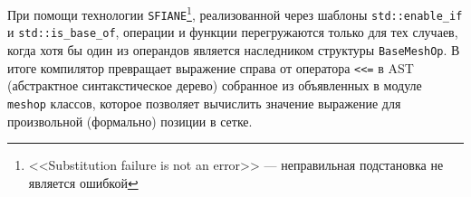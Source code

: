 При помощи технологии \verb'SFIANE'\footnote{<<Substitution failure is not an error>> --- неправильная подстановка не является ошибкой},
реализованной через шаблоны \verb'std::enable_if' и \verb'std::is_base_of', операции и функции перегружаются только для тех случаев,
когда хотя бы один из операндов является наследником структуры \verb'BaseMeshOp'. В итоге компилятор превращает
выражение справа от оператора \verb'<<=' в AST (абстрактное синтакстическое дерево) собранное из
объявленных в модуле \verb'meshop' классов, которое позволяет  вычислить значение выражение для произвольной (формально) позиции в сетке. 
